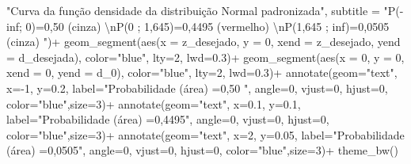 \documentclass[
]{book}
\newenvironment{Shaded}{\begin{snugshade}}{\end{snugshade}}
\newcommand{\AttributeTok}[1]{\textcolor[rgb]{0.77,0.63,0.00}{#1}}
\newcommand{\DecValTok}[1]{\textcolor[rgb]{0.00,0.00,0.81}{#1}}
\newcommand{\FloatTok}[1]{\textcolor[rgb]{0.00,0.00,0.81}{#1}}
\newcommand{\FunctionTok}[1]{\textcolor[rgb]{0.00,0.00,0.00}{#1}}
\newcommand{\NormalTok}[1]{#1}
\newcommand{\SpecialCharTok}[1]{\textcolor[rgb]{0.00,0.00,0.00}{#1}}
\newcommand{\StringTok}[1]{\textcolor[rgb]{0.31,0.60,0.02}{#1}}
\begin{document}
\begin{Shaded}
\begin{Highlighting}[]
      \StringTok{"Curva da função densidade da distribuição Normal padronizada"}\NormalTok{, }
      \AttributeTok{subtitle =} \StringTok{"P({-}inf; 0)=0,50 (cinza) }\SpecialCharTok{\textbackslash{}n}\StringTok{P(0 ; 1,645)=0,4495 (vermelho) }\SpecialCharTok{\textbackslash{}n}\StringTok{P(1,645 ; inf)=0,0505 (cinza) "}\NormalTok{)}\SpecialCharTok{+}
  \FunctionTok{geom\_segment}\NormalTok{(}\FunctionTok{aes}\NormalTok{(}\AttributeTok{x =}\NormalTok{ z\_desejado, }\AttributeTok{y =} \DecValTok{0}\NormalTok{, }\AttributeTok{xend =}\NormalTok{ z\_desejado, }\AttributeTok{yend =}\NormalTok{ d\_desejada), }\AttributeTok{color=}\StringTok{"blue"}\NormalTok{, }\AttributeTok{lty=}\DecValTok{2}\NormalTok{, }\AttributeTok{lwd=}\FloatTok{0.3}\NormalTok{)}\SpecialCharTok{+}
  \FunctionTok{geom\_segment}\NormalTok{(}\FunctionTok{aes}\NormalTok{(}\AttributeTok{x =} \DecValTok{0}\NormalTok{, }\AttributeTok{y =} \DecValTok{0}\NormalTok{, }\AttributeTok{xend =} \DecValTok{0}\NormalTok{, }\AttributeTok{yend =}\NormalTok{ d\_0), }\AttributeTok{color=}\StringTok{"blue"}\NormalTok{, }\AttributeTok{lty=}\DecValTok{2}\NormalTok{, }\AttributeTok{lwd=}\FloatTok{0.3}\NormalTok{)}\SpecialCharTok{+}
  \FunctionTok{annotate}\NormalTok{(}\AttributeTok{geom=}\StringTok{"text"}\NormalTok{, }\AttributeTok{x=}\SpecialCharTok{{-}}\DecValTok{1}\NormalTok{, }\AttributeTok{y=}\FloatTok{0.2}\NormalTok{, }\AttributeTok{label=}\StringTok{"Probabilidade (área) =0,50 "}\NormalTok{, }\AttributeTok{angle=}\DecValTok{0}\NormalTok{, }\AttributeTok{vjust=}\DecValTok{0}\NormalTok{, }\AttributeTok{hjust=}\DecValTok{0}\NormalTok{, }\AttributeTok{color=}\StringTok{"blue"}\NormalTok{,}\AttributeTok{size=}\DecValTok{3}\NormalTok{)}\SpecialCharTok{+}
  \FunctionTok{annotate}\NormalTok{(}\AttributeTok{geom=}\StringTok{"text"}\NormalTok{, }\AttributeTok{x=}\FloatTok{0.1}\NormalTok{, }\AttributeTok{y=}\FloatTok{0.1}\NormalTok{, }\AttributeTok{label=}\StringTok{"Probabilidade (área) =0,4495"}\NormalTok{, }\AttributeTok{angle=}\DecValTok{0}\NormalTok{, }\AttributeTok{vjust=}\DecValTok{0}\NormalTok{, }\AttributeTok{hjust=}\DecValTok{0}\NormalTok{, }\AttributeTok{color=}\StringTok{"blue"}\NormalTok{,}\AttributeTok{size=}\DecValTok{3}\NormalTok{)}\SpecialCharTok{+}
  \FunctionTok{annotate}\NormalTok{(}\AttributeTok{geom=}\StringTok{"text"}\NormalTok{, }\AttributeTok{x=}\DecValTok{2}\NormalTok{, }\AttributeTok{y=}\FloatTok{0.05}\NormalTok{, }\AttributeTok{label=}\StringTok{"Probabilidade (área) =0,0505"}\NormalTok{, }\AttributeTok{angle=}\DecValTok{0}\NormalTok{, }\AttributeTok{vjust=}\DecValTok{0}\NormalTok{, }\AttributeTok{hjust=}\DecValTok{0}\NormalTok{, }\AttributeTok{color=}\StringTok{"blue"}\NormalTok{,}\AttributeTok{size=}\DecValTok{3}\NormalTok{)}\SpecialCharTok{+}
  \FunctionTok{theme\_bw}\NormalTok{()}
\end{Highlighting}
\end{Shaded}
\end{document}
